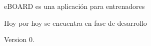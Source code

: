 e\+B\+O\+A\+RD es una aplicación para entrenadores

Hoy por hoy se encuentra en fase de desarrollo

\begin{DoxyVersion}{Version}
0. 
\end{DoxyVersion}
